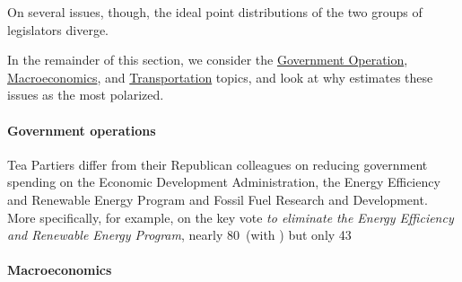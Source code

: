 On several issues, though, the ideal point distributions of the two groups of
legislators diverge.








In the remainder of this section, we consider the
\underline{Government Operation}, \underline{Macroeconomics}, and
\underline{Transportation} topics, and look at why \name{} estimates these issues as
the most polarized.

\paragraph{Government operations}

Tea Partiers differ from their Republican colleagues on reducing
government spending on the Economic Development Administration, the
Energy Efficiency and Renewable Energy Program and Fossil Fuel
Research and Development. More specifically, for example, on the key
vote \textit{to eliminate the Energy Efficiency and Renewable Energy
  Program}, nearly 80\
(with \fw{}) but only 43\










































\paragraph{Macroeconomics}








































